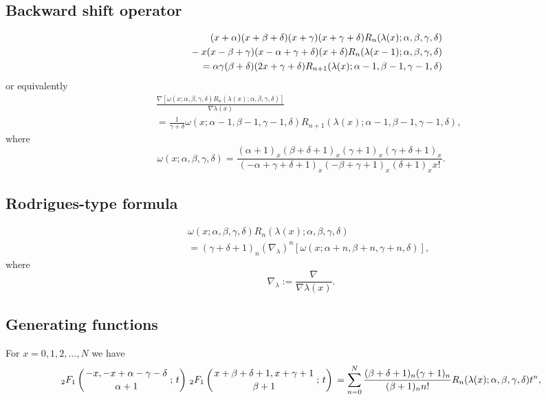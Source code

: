 \documentclass[envcountchap,graybox]{svmono}
\newcommand{\hyp}[5]{\mbox{}_{#1}{F}_{#2}
\left(\genfrac{}{}{0pt}{}{#3}{#4}\,;\,#5\right)}
\newcommand{\mathindent}{\hspace{7.5mm}}
\newcommand{\hyp}[5]{\,\mbox{}_{#1}F_{#2}\!\left(
  \genfrac{}{}{0pt}{}{#3}{#4};#5\right)}
\begin{document}
\subsection*{Backward shift operator}
\begin{eqnarray}
\label{shift2RacahI}
& &(x+\alpha)(x+\beta+\delta)(x+\gamma)(x+\gamma+\delta)R_n(\lambda(x);\alpha,\beta,\gamma,\delta)\nonumber\\
& &{}\mathindent{}-x(x-\beta+\gamma)(x-\alpha+\gamma+\delta)(x+\delta)R_n(\lambda(x-1);\alpha,\beta,\gamma,\delta)\nonumber\\
& &{}=\alpha\gamma(\beta+\delta)(2x+\gamma+\delta)R_{n+1}(\lambda(x);\alpha-1,\beta-1,\gamma-1,\delta)
\end{eqnarray}
or equivalently
\begin{eqnarray}
\label{shift2RacahII}
& &\frac{\nabla\left[\omega(x;\alpha,\beta,\gamma,\delta)R_n(\lambda(x);\alpha,\beta,\gamma,\delta)\right]}{\nabla\lambda(x)}\nonumber\\
& &{}=\frac{1}{\gamma+\delta}\omega(x;\alpha-1,\beta-1,\gamma-1,\delta)
R_{n+1}(\lambda(x);\alpha-1,\beta-1,\gamma-1,\delta),
\end{eqnarray}
where
$$\omega(x;\alpha,\beta,\gamma,\delta)=\frac{(\alpha+1)_x(\beta+\delta+1)_x(\gamma+1)_x(\gamma+\delta+1)_x}
{(-\alpha+\gamma+\delta+1)_x(-\beta+\gamma+1)_x(\delta+1)_xx!}.$$

\subsection*{Rodrigues-type formula}
\begin{eqnarray}
\label{RodRacah}
& &\omega(x;\alpha,\beta,\gamma,\delta)R_n(\lambda(x);\alpha,\beta,\gamma,\delta)\nonumber\\
& &{}=(\gamma+\delta+1)_n\left(\nabla_{\lambda}\right)^n\left[\omega(x;\alpha+n,\beta+n,\gamma+n,\delta)\right],
\end{eqnarray}
where
$$\nabla_{\lambda}:=\frac{\nabla}{\nabla\lambda(x)}.$$

\subsection*{Generating functions}
For $x=0,1,2,\ldots,N$ we have
\begin{equation}
\label{GenRacah1}
\hyp{2}{1}{-x,-x+\alpha-\gamma-\delta}{\alpha+1}{t}\,\hyp{2}{1}{x+\beta+\delta+1,x+\gamma+1}{\beta+1}{t}
{}=\sum_{n=0}^N\frac{(\beta+\delta+1)_n(\gamma+1)_n}{(\beta+1)_nn!}
R_n(\lambda(x);\alpha,\beta,\gamma,\delta)t^n,
\end{equation}
\end{document}
